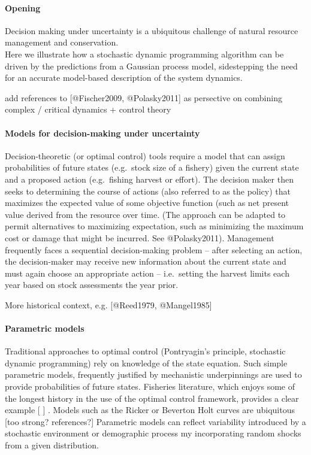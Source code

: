 \documentclass[author-year, review]{elsarticle} %
\begin{document}
\paragraph{Opening}

Decision making under uncertainty is a ubiquitous challenge of natural
resource management and conservation.\\Here we illustrate how a
stochastic dynamic programming algorithm can be driven by the
predictions from a Gaussian process model, sidestepping the need for an
accurate model-based description of the system dynamics.

add references to {[}@Fischer2009, @Polasky2011{]} as persective on
combining complex / critical dynamics + control theory

\paragraph{Models for decision-making under uncertainty}

Decision-theoretic (or optimal control) tools require a model that can
assign probabilities of future states (e.g.~stock size of a fishery)
given the current state and a proposed action (e.g.~fishing harvest or
effort). The decision maker then seeks to determining the course of
actions (also referred to as the policy) that maximizes the expected
value of some objective function (such as net present value derived from
the resource over time. (The approach can be adapted to permit
alternatives to maximizing expectation, such as minimizing the maximum
cost or damage that might be incurred. See @Polasky2011). Management
frequently faces a sequential decision-making problem -- after selecting
an action, the decision-maker may receive new information about the
current state and must again choose an appropriate action --
i.e.~setting the harvest limits each year based on stock assessments the
year prior.

More historical context, e.g. {[}@Reed1979, @Mangel1985{]}

\paragraph{Parametric models}

Traditional approaches to optimal control (Pontryagin's principle,
stochastic dynamic programming) rely on knowledge of the state equation.
Such simple parametric models, frequently justified by mechanistic
underpinnings are used to provide probabilities of future states.
Fisheries literature, which enjoys some of the longest history in the
use of the optimal control framework, provides a clear example {[} {]} .
Models such as the Ricker or Beverton Holt curves are ubiquitous {[}too
strong? references?{]} Parametric models can reflect variability
introduced by a stochastic environment or demographic process my
incorporating random shocks from a given distribution.
\end{document}
